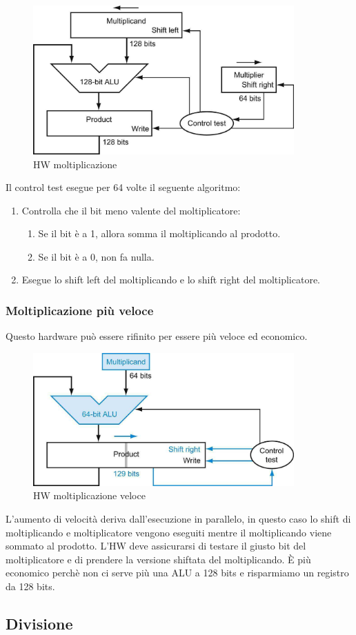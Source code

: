 \begin{figure}[H]
    \centering
    \includegraphics[width=100mm,scale=1.5]{pictures/schemaMoltiplicazione.png}
    \caption{HW moltiplicazione}
    \label{fig:hw-multiplication}
\end{figure}
\newpage
Il control test esegue per 64 volte il seguente algoritmo:
\begin{enumerate}
    \item Controlla che il bit meno valente del moltiplicatore:
    \begin{enumerate}
        \item Se il bit è a 1, allora somma il moltiplicando al prodotto.
        \item Se il bit è a 0, non fa nulla.
    \end{enumerate}
    \item Esegue lo shift left del moltiplicando e lo shift right del moltiplicatore.
\end{enumerate}
\subsubsection{Moltiplicazione più veloce}
Questo hardware può essere rifinito per essere più veloce ed economico.

\begin{figure}[H]
    \centering
    \includegraphics[width=100mm,scale=1.5]{pictures/schemaMoltiplicazioneVeloce.png}
    \caption{HW moltiplicazione veloce}
    \label{fig:hw-multiplication}
\end{figure}

L'aumento di velocità deriva dall'esecuzione in parallelo, in questo caso lo shift di moltiplicando e moltiplicatore vengono eseguiti 
mentre il moltiplicando viene sommato al prodotto. L'HW deve assicurarsi di testare il giusto bit del moltiplicatore e di 
prendere la versione shiftata del moltiplicando. È più economico perchè non ci serve più una ALU a 128 bits e risparmiamo un 
registro da 128 bits. 

\subsection{Divisione}
